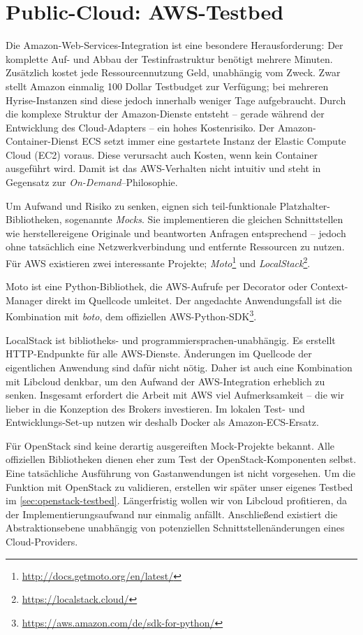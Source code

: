 \section{Public-Cloud: AWS-Testbed}
\label{sec:aws-testbed}

Die Amazon-Web-Services-Integration ist eine besondere Herausforderung: Der komplette Auf- und Abbau der Testinfrastruktur benötigt mehrere Minuten. Zusätzlich kostet jede Ressourcennutzung Geld, unabhängig vom Zweck. Zwar stellt Amazon einmalig 100 Dollar Testbudget zur Verfügung; bei mehreren Hyrise-Instanzen sind diese jedoch innerhalb weniger Tage aufgebraucht. Durch die komplexe Struktur der Amazon-Dienste entsteht -- gerade während der Entwicklung des Cloud-Adapters -- ein hohes Kostenrisiko. Der Amazon-Container-Dienst ECS setzt immer eine gestartete Instanz der Elastic Compute Cloud (EC2) voraus. Diese verursacht auch Kosten, wenn kein Container ausgeführt wird. Damit ist das AWS-Verhalten nicht intuitiv und steht in Gegensatz zur \emph{On-Demand}--Philosophie.

Um Aufwand und Risiko zu senken, eignen sich teil-funktionale Platzhalter-Bibliotheken, sogenannte \emph{Mocks}. Sie implementieren die gleichen Schnittstellen wie herstellereigene Originale und beantworten Anfragen entsprechend -- jedoch ohne tatsächlich eine Netzwerkverbindung und entfernte Ressourcen zu nutzen. Für AWS existieren zwei interessante Projekte; \emph{Moto}\footnote{\url{http://docs.getmoto.org/en/latest/}} und \emph{LocalStack}\footnote{\url{https://localstack.cloud/}}. 

Moto ist eine Python-Bibliothek, die AWS-Aufrufe per Decorator oder Context-Manager direkt im Quellcode umleitet. Der angedachte Anwendungsfall ist die Kombination mit \emph{boto}, dem offiziellen AWS-Python-SDK\footnote{\url{https://aws.amazon.com/de/sdk-for-python/}}.

LocalStack ist  bibliotheks- und programmiersprachen-unabhängig. Es erstellt HTTP-Endpunkte für alle AWS-Dienste. Änderungen im Quellcode der eigentlichen Anwendung sind dafür nicht nötig. Daher ist auch eine Kombination mit Libcloud denkbar, um den Aufwand der AWS-Integration erheblich zu senken. Insgesamt erfordert die Arbeit mit AWS viel Aufmerksamkeit -- die wir lieber in die Konzeption des Brokers investieren. Im lokalen Test- und Entwicklungs-Set-up nutzen wir deshalb Docker als Amazon-ECS-Ersatz.

Für OpenStack sind keine derartig ausgereiften Mock-Projekte bekannt. Alle offiziellen Bibliotheken dienen eher zum Test der OpenStack-Komponenten selbst. Eine tatsächliche Ausführung von Gastanwendungen ist nicht vorgesehen. Um die Funktion mit OpenStack zu validieren, erstellen wir später unser eigenes Testbed im \autoref{sec:openstack-testbed}. Längerfristig wollen wir von Libcloud profitieren, da der Implementierungsaufwand nur einmalig anfällt. Anschließend existiert die Abstraktionsebene unabhängig von potenziellen Schnittstellenänderungen eines Cloud-Providers.